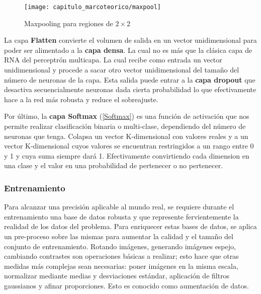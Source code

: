 
\begin{figure}[H]
    \centering
    \texttt{[image: capitulo\_marcoteorico/maxpool]}
    \caption{Maxpooling para regiones de $2 \times 2$}\label{fig:pool}
\end{figure}

La capa \textbf{Flatten} convierte el volumen de salida en un vector
unidimensional para poder ser alimentado a la \textbf{capa densa}. La cual no es
más que la clásica capa de RNA del perceptrón multicapa. La cual recibe como
entrada un vector unidimensional y procede a sacar otro vector unidimensional
del tamaño del número de neuronas de la capa. Esta salida puede entrar a la
\textbf{capa dropout} que desactiva secuencialmente neuronas dada cierta
probabilidad lo que efectivamente hace a la red más robusta y reduce el
sobreajuste.

Por último, la \textbf{capa Softmax} (\autoref{Softmax}) es una función de activación que nos
permite realizar clasificación binaria o multi-clase, dependiendo del número de
neuronas que tenga. Colapsa un vector K-dimensional con valores reales y a un
vector K-dimensional cuyos valores se encuentran restringidos a un rango entre 0
y 1 y cuya suma siempre dará 1. Efectivamente convirtiendo cada dimension en una
clase y el valor en una probabilidad de pertenecer o no pertenecer.


\subsubsection{Entrenamiento}

Para alcanzar una precisión aplicable al mundo real, se requiere durante el
entrenamiento una base de datos robusta y que represente fervientemente la
realidad de los datos del problema. Para enriquecer estas bases de datos, se
aplica un pre-proceso sobre las mismas para aumentar la calidad y el tamaño del
conjunto de entrenamiento. Rotando imágenes, generando imágenes espejo,
cambiando contrastes son operaciones básicas a realizar; esto hace que otras
medidas más complejas sean necesarias: poner imágenes en la misma escala,
normalizar mediante medias y desviaciones estándar, aplicación de filtros
gaussianos y afinar proporciones. Esto es conocido como aumentación de datos.

